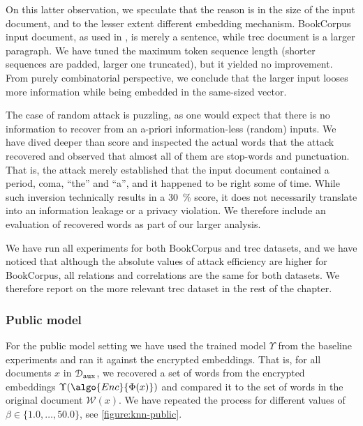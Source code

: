 				On this latter observation, we speculate that the reason is in the size of the input document, and to the lesser extent different embedding mechanism.
				BookCorpus input document, as used in \cite{embedding-attacks}, is merely a sentence, while \acrshort{trec} document is a larger paragraph.
				We have tuned the maximum token sequence length (shorter sequences are padded, larger one truncated), but it yielded no improvement.
				From purely combinatorial perspective, we conclude that the larger input looses more information while being embedded in the same-sized vector.

				The case of random attack is puzzling, as one would expect that there is no information to recover from an a-priori information-less (random) inputs.
				We have dived deeper than \FOne{} score and inspected the actual words that the attack recovered and observed that almost all of them are stop-words and punctuation.
				That is, the attack merely established that the input document contained a period, coma, ``the'' and ``a'', and it happened to be right some of time.
				While such inversion technically results in a \SI{30}{\percent} \FOne{} score, it does not necessarily translate into an information leakage or a privacy violation.
				We therefore include an evaluation of recovered words as part of our larger analysis.

				We have run all experiments for both BookCorpus and \acrshort{trec} datasets, and we have noticed that although the absolute values of attack efficiency are higher for BookCorpus, all relations and correlations are the same for both datasets.
				We therefore report on the more relevant \acrshort{trec} dataset in the rest of the chapter.

			\subsubsection{Public model}

				For the public model setting we have used the trained model $\Upsilon$ from the baseline experiments and ran it against the encrypted embeddings.
				That is, for all documents $x$ in $\mathcal{D}_\text{aux}$, we recovered a set of words from the encrypted embeddings $\Upsilon( \algo{Enc}{ \Phi(x) } )$ and compared it to the set of words in the original document $\mathcal{W}(x)$.
				We have repeated the process for different values of $\beta \in \{ 1.0, \ldots, 50.0 \}$, see \cref{figure:knn-public}.

				

